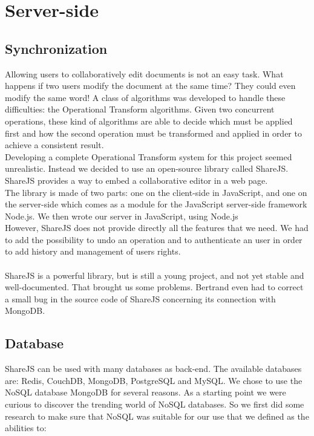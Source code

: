 \documentclass{llncs}
\begin{document}
\section{Server-side}\label{sec:Server-side}

\subsection{Synchronization}

Allowing users to collaboratively edit documents is not an easy task.
What happens if two users modify the document at the same time?
They could even modify the same word! A class of algorithms was developed to handle these difficulties:
the Operational Transform algorithms. Given two concurrent operations, these kind
of algorithms are able to decide which must be applied first and how the second
operation must be transformed and applied in order to achieve a consistent result.\\
Developing a complete Operational Transform system for this project seemed unrealistic.
Instead we decided to use an open-source library called ShareJS.\cite{sharejs}
ShareJS provides a way to embed a collaborative editor in a web page.\\
The library is made of two parts: one on the client-side in JavaScript, 
and one on the server-side which comes as a module for the JavaScript server-side framework
Node.js.\cite{nodejs} We then wrote our server in JavaScript, using Node.js\\
However, ShareJS does not provide directly all the features that we need. 
We had to add the possibility to undo an operation and to authenticate an user in order to add
history and management of users rights.\\
\\
ShareJS is a powerful library, but is still a young project, and not yet stable and well-documented.
That brought us some problems.
Bertrand even had to correct a small bug in the source code of ShareJS concerning its connection with MongoDB.

\subsection{Database}
ShareJS can be used with many databases as back-end. 
The available databases are: Redis, CouchDB, MongoDB, PostgreSQL and MySQL.
We chose to use the NoSQL database MongoDB\cite{mongo} for several reasons. As a starting
point we were curious to discover the trending world of NoSQL databases. So we
first did some research to make sure that NoSQL was suitable for our use that we
defined as the abilities to:
\end{document}

